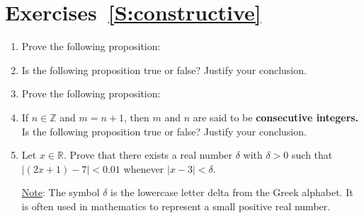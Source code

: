 \section*{Exercises~\ref{S:constructive}}
\begin{enumerate}
%
\item Prove the following proposition: \label{exer:sec35-1}

\item Is the following proposition true or false?  Justify your conclusion.

\label{exer:35start}


\item Prove the following proposition: \label{exer:sec35-3}

\item If  $n \in \mathbb{Z}$ and  $m = n + 1$, then  $m$  and  $n$  are said to be \textbf{consecutive integers.} \label{exer:sec35-4}
%
%
Is the following proposition true or false?  Justify your conclusion.

\item Let  $x \in \mathbb{R}$.  Prove that there exists a real number  $\delta $
 with  $\delta  > 0$ such that $\left| {\left( {2x + 1} \right) - 7} \right| < 0.01$  whenever  $\left| {x - 3} \right| < \delta $. \label{exer:sec35-6}

\underline{Note}:  The symbol  $\delta $ is the lowercase letter delta from the Greek alphabet.  It is often used in mathematics to represent a small positive real number.


\end{enumerate}
